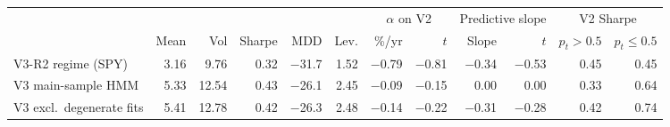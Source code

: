 \begin{tabular}{lrrrrrrrrrrr}
\toprule
& & & & & & \multicolumn{2}{c}{$\alpha$ on V2} & \multicolumn{2}{c}{Predictive slope} & \multicolumn{2}{c}{V2 Sharpe} \\
\cmidrule(lr){7-8}\cmidrule(lr){9-10}\cmidrule(lr){11-12}
 & Mean & Vol & Sharpe & MDD & Lev. & \%/yr & $t$ & Slope & $t$ & $p_t > 0.5$ & $p_t \le 0.5$ \\
\midrule
V3-R2 regime (SPY) & 3.16 & 9.76 & 0.32 & $-$31.7 & 1.52 & $-$0.79 & $-$0.81 & $-$0.34 & $-$0.53 & 0.45 & 0.45 \\
V3 main-sample HMM & 5.33 & 12.54 & 0.43 & $-$26.1 & 2.45 & $-$0.09 & $-$0.15 & 0.00 & 0.00 & 0.33 & 0.64 \\
V3 excl.\ degenerate fits & 5.41 & 12.78 & 0.42 & $-$26.3 & 2.48 & $-$0.14 & $-$0.22 & $-$0.31 & $-$0.28 & 0.42 & 0.74 \\
\bottomrule
\end{tabular}
